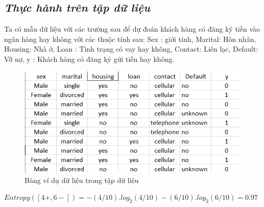 \documentclass{report}
\begin{document}
\subsection{\textit{Thực hành trên tập dữ liệu}}
    \fontsize{13}{14}\selectfont
    Ta có mẫu dữ liệu với các trường sau để dự đoán khách hàng có đăng ký tiền vào ngân hàng hay không với các thuộc tính sau: Sex : giới tính, Marital: Hôn nhân, Housing: Nhà ở, Loan : Tình trạng có vay hay không, Contact: Liên lạc, Default: Vỡ nợ, y : Khách hàng có đăng ký gửi tiền hay không. 
      \begin{center}
        \begin{figure}[htp]
    	\begin{center}
    		\includegraphics[scale=0.8]{images/vd_dt.png}
    	\end{center}
    		\caption{Bảng ví dụ dữ liệu trong tập dữ liệu}
    \end{figure}
    \end{center}
   $ Entropy ([4+,6-]) = -(4/10).log_2(4/10) - (6/10).log_2(6/10) = 0.97 $
  
\end{document}
